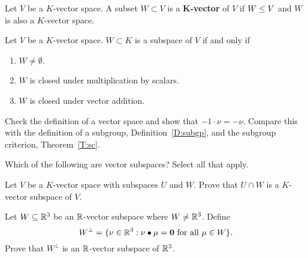 \documentclass{ximera}
\begin{document}
\begin{definition}
  Let $V$ be a $K$-vector space. A subset $W\subset V$ is a
  \textbf{$\boldsymbol K$-vector}  of $V$ if $W\leq V$ and $W$
  is also a $K$-vector space.
\end{definition}

\begin{lemma}
  Let $V$ be a $K$-vector space. $W\subset K$ is a subspace of $V$ if
  and only if
  \begin{enumerate}
  \item $W\ne \emptyset$.
  \item $W$ is closed under multiplication by scalars.
  \item $W$ is closed under vector addition.
  \end{enumerate}
  \begin{sketch}
    Check the definition of a vector space and show that $-1\cdot \nu=
    -\nu$. Compare this with the definition of a subgroup,
    Definition~\ref{D:subgp}, and the subgroup criterion, Theorem~\ref{T:sc}.
  \end{sketch}
\end{lemma}

\begin{exercise}
  Which of the following are vector subspaces? Select all that apply.
  \begin{selectAll}
  \end{selectAll}
\end{exercise}


\begin{exercise}
  Let $V$ be a $K$-vector space with subspaces $U$ and $W$. Prove that
  $U\cap W$ is a $K$-vector subspace of $V$.
\end{exercise}

\begin{exercise}
  Let $W\subseteq \mathbb R^3$ be an $\mathbb R$-vector subspace where $W\ne \mathbb R^3$.
  Define
  \[
  W^\perp = \{\nu\in\mathbb R^3: \nu \bullet \mu = \mathbf{0}\text{ for all $\mu\in W$} \}.
  \]
  Prove that $W^\perp$ is an $\mathbb R$-vector subspace of $\mathbb R^3$.
\end{exercise}
\end{document}
